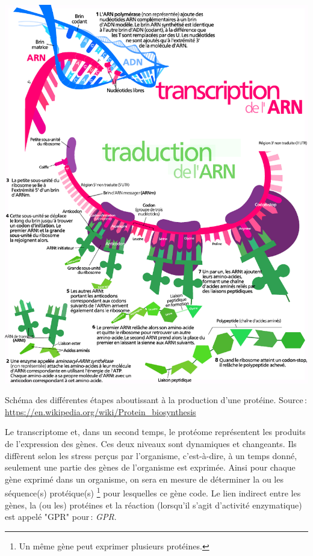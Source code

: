\begin{refsegment}
    \begin{shadedfigure}[H]
        \centering
        \includegraphics[width=\textwidth]{img/production_proteine2.pdf}
        \caption{Schéma des différentes étapes aboutissant à la production d’une protéine.\hspace{\textwidth} Source : \url{https://en.wikipedia.org/wiki/Protein_biosynthesis}}
        \label{fig:production_proteine}
    \end{shadedfigure}
    
    Le transcriptome et, dans un second temps, le protéome représentent les produits de l'expression des gènes. Ces deux niveaux sont dynamiques et changeants. Ils diffèrent selon les stress perçus par l'organisme, c'est-à-dire, à un temps donné, seulement une partie des gènes de l'organisme est exprimée. Ainsi pour chaque gène exprimé dans un organisme, on sera en mesure de déterminer la ou les séquence(s) protéique(s) \footnote{Un même gène peut exprimer plusieurs protéines.} pour lesquelles ce gène code. Le lien indirect entre les gènes, la (ou les) protéines et la réaction (lorsqu’il s’agit d’activité enzymatique) est appelé "\acrshort{GPR}" pour : \textit{\acrfull{GPR}}.
    

\end{refsegment}
